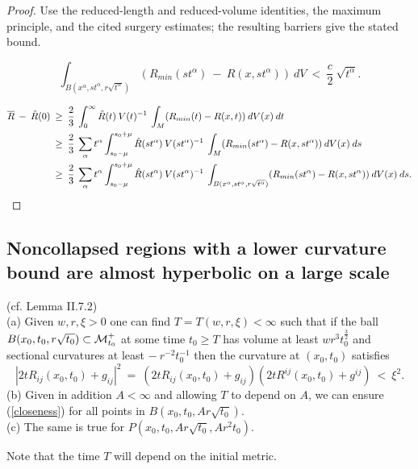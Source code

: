 \begin{proof}
\sketch Use the reduced-length and reduced-volume identities, the maximum principle, and the cited surgery estimates; the resulting barriers give the stated bound.

\begin{equation} \label{poscont}
\int_{B(x^\alpha, {s} t^\alpha, r \sqrt{t^\alpha})}
(R_{min}({s} t^\alpha) \: - \: R(x, {s} t^\alpha)) \:
dV \: < \: \frac{c}{2}
\: \sqrt{t^\alpha}.
\end{equation}

\begin{align} \label{Ralign}
\overline{R} \: - \: \hat{R}(0) \: & \ge \:
\frac23 \: \int_0^\infty \hat{R}(t) \: V(t)^{-1} \:
\int_M (R_{min}(t) - R(x,t)) \: dV(x) \: dt \\
& \ge \:
\frac23 \: \sum_{\alpha} t^\alpha
\int_{s_0- \mu}^{s_0 + \mu} \hat{R}(s t^\alpha) \: V(s t^\alpha)^{-1} \:
\int_M (R_{min}(s t^\alpha) - R(x,s t^\alpha)) \: dV(x) \: ds \notag \\
& \ge \:
\frac23 \: \sum_{\alpha} t^\alpha
\int_{s_0- \mu}^{s_0 + \mu} \hat{R}(s t^\alpha) \: V(s t^\alpha)^{-1} \:
\int_{B(x^\alpha, {s} t^\alpha, r \sqrt{t^\alpha})}
(R_{min}(s t^\alpha) - R(x,s t^\alpha)) \: dV(x) \: ds. \notag
\end{align}
\end{proof}

\subsection{Noncollapsed regions with a lower curvature bound are almost hyperbolic on a large scale}

\begin{lemma}
  \label{lem:kl-noncollapsed-regions-lower-curvature-bound-almost-hyperbolic-large-scale-noncollapsing-lemma}
 \label{lemII.7.2} (cf. Lemma II.7.2) \\
(a) Given $w, r, \xi > 0$ one can find $T = T(w,r,\xi) < \infty$ such that
if the ball $B(x_0, t_0, r \sqrt{t_0}) \subset {\mathcal M}_{t_0}^+$ at some time $t_0 \ge T$ has
volume at least $wr^3 t_0^{\frac32}$ and sectional curvatures at least
$- \: r^{-2} t_0^{-1}$ then the curvature at $(x_0, t_0)$
satisfies
\begin{equation} \label{closeness}
|2tR_{ij}(x_0, t_0) + g_{ij}|^2 \: = \:
(2tR_{ij}(x_0, t_0) + g_{ij})(2tR^{ij}(x_0, t_0) + g^{ij}) \: < \: \xi^2.
\end{equation}
(b) Given in addition $A < \infty$ and allowing $T$ to depend on $A$, we
can ensure (\ref{closeness}) for all points in
$B(x_0, t_0, Ar \sqrt{t_0})$. \\
(c) The same is true for $P(x_0, t_0, Ar \sqrt{t_0}, A r^2 t_0)$.

Note that the time $T$ will depend on the initial metric.
\end{lemma}


